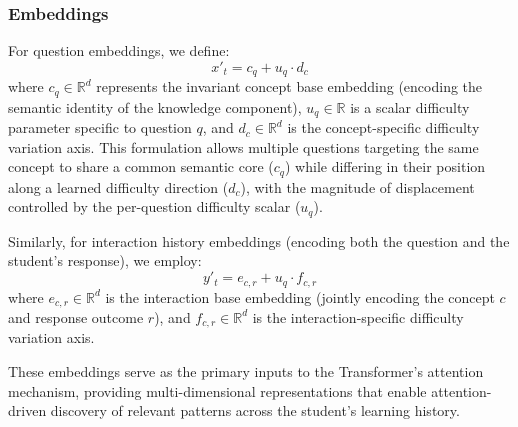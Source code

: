 \documentclass[applsci,article,submit,moreauthors,pdftex]{Definitions/mdpi}
\begin{document}

\subsubsection{Embeddings} \label{sec_embeddings}

For question embeddings, we define:
\begin{equation} \label{eq:task_embedding}
    x'_t = c_q + u_q \cdot d_c
\end{equation}
where $c_q \in \mathbb{R}^{d}$ represents the invariant concept base embedding (encoding the semantic identity of the knowledge component), $u_q \in \mathbb{R}$ is a scalar difficulty parameter specific to question $q$, and $d_c \in \mathbb{R}^{d}$ is the concept-specific difficulty variation axis. This formulation allows multiple questions targeting the same concept to share a common semantic core ($c_q$) while differing in their position along a learned difficulty direction ($d_c$), with the magnitude of displacement controlled by the per-question difficulty scalar ($u_q$).

Similarly, for interaction history embeddings (encoding both the question and the student's response), we employ:
\begin{equation} \label{eq:interaction_embedding}
    y'_t = e_{c,r} + u_q \cdot f_{c,r}
\end{equation}
where $e_{c,r} \in \mathbb{R}^{d}$ is the interaction base embedding (jointly encoding the concept $c$ and response outcome $r$), and $f_{c,r} \in \mathbb{R}^{d}$ is the interaction-specific difficulty variation axis. 


These embeddings serve as the primary inputs to the Transformer's attention mechanism, providing multi-dimensional representations that enable attention-driven discovery of relevant  patterns across the student's learning history.
\end{document}
